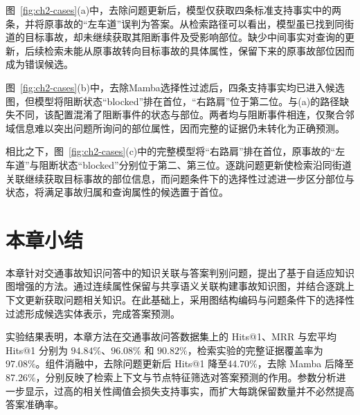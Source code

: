图~\ref{fig:ch2-cases}(a)中，去除问题更新后，模型仅获取四条标准支持事实中的两条，并将原事故的“左车道”误判为答案。从检索路径可以看出，模型虽已找到同街道的目标事故，却未继续获取其阻断事件及受影响部位。缺少中间事实对查询的更新，后续检索未能从原事故转向目标事故的具体属性，保留下来的原事故部位因而成为错误候选。

图~\ref{fig:ch2-cases}(b)中，去除Mamba选择性过滤后，四条支持事实均已进入候选图，但模型将阻断状态“blocked”排在首位，“右路肩”位于第二位。与(a)的路径缺失不同，该配置混淆了阻断事件的状态与部位。两者均与阻断事件相连，仅聚合邻域信息难以突出问题所询问的部位属性，因而完整的证据仍未转化为正确预测。

相比之下，图~\ref{fig:ch2-cases}(c)中的完整模型将“右路肩”排在首位，原事故的“左车道”与阻断状态“blocked”分别位于第二、第三位。逐跳问题更新使检索沿同街道关联继续获取目标事故的部位信息，而问题条件下的选择性过滤进一步区分部位与状态，将满足事故归属和查询属性的候选置于首位。

\endgroup

\section{本章小结}

本章针对交通事故知识问答中的知识关联与答案判别问题，提出了基于自适应知识图增强的方法。通过连续属性保留与共享语义关联构建事故知识图，并结合逐跳上下文更新获取问题相关知识。在此基础上，采用图结构编码与问题条件下的选择性过滤形成候选实体表示，完成答案预测。

实验结果表明，本章方法在交通事故问答数据集上的 Hits@1、MRR 与宏平均 Hits@1 分别为 $94.84\%$、$96.08\%$ 和 $90.82\%$，检索实验的完整证据覆盖率为 $97.08\%$。组件消融中，去除问题更新后 Hits@1 降至44.70\%，去除 Mamba 后降至87.26\%，分别反映了检索上下文与节点特征筛选对答案预测的作用。参数分析进一步显示，过高的相关性阈值会损失支持事实，而扩大每跳保留数量并不必然提高答案准确率。
